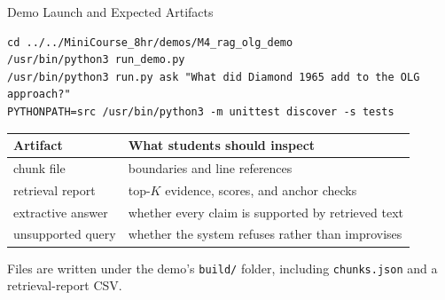 \begin{frame}[fragile]{Demo Launch and Expected Artifacts}
\begin{lstlisting}[basicstyle=\ttfamily\scriptsize, numbers=none]
cd ../../MiniCourse_8hr/demos/M4_rag_olg_demo
/usr/bin/python3 run_demo.py
/usr/bin/python3 run.py ask "What did Diamond 1965 add to the OLG approach?"
PYTHONPATH=src /usr/bin/python3 -m unittest discover -s tests
\end{lstlisting}

\vspace{0.2cm}
\begin{tabular}{p{3.0cm}p{8.5cm}}
\toprule
\textbf{Artifact} & \textbf{What students should inspect} \\
\midrule
chunk file & boundaries and line references \\
retrieval report & top-$K$ evidence, scores, and anchor checks \\
extractive answer & whether every claim is supported by retrieved text \\
unsupported query & whether the system refuses rather than improvises \\
\bottomrule
\end{tabular}

\vspace{0.12cm}
{\scriptsize Files are written under the demo's \texttt{build/} folder, including \texttt{chunks.json} and a retrieval-report CSV.}
\end{frame}

